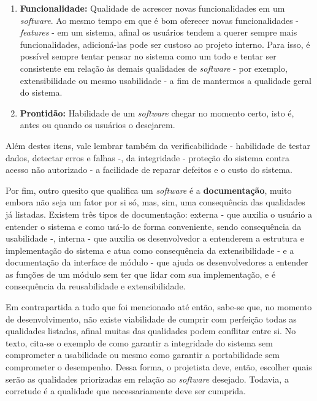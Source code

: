 \documentclass[12pt, a4paper]{article}
\begin{document}
\begin{enumerate}
            \item \textbf{Funcionalidade:} Qualidade de acrescer novas funcionalidades em um \textit{software}. Ao mesmo tempo em que é bom oferecer novas funcionalidades - \textit{features} - em um sistema, afinal os usuários tendem a querer sempre mais funcionalidades, adicioná-las pode ser custoso ao projeto interno. Para isso, é possível sempre tentar pensar no sistema como um todo e tentar ser consistente em relação às demais qualidades de \textit{software} - por exemplo, extensibilidade ou mesmo usabilidade - a fim de mantermos a qualidade geral do sistema.
            
            \item \textbf{Prontidão:} Habilidade de um \textit{software} chegar no momento certo, isto é, antes ou quando os usuários o desejarem.
        \end{enumerate}
        
    Além destes itens, vale lembrar também da verificabilidade - habilidade de testar dados, detectar erros e falhas -, da integridade - proteção do sistema contra acesso não autorizado - a facilidade de reparar defeitos e o custo do sistema. 
        
    Por fim, outro quesito que qualifica um \textit{software} é a \textbf{documentação}, muito embora não seja um fator por si só, mas, sim, uma consequência das qualidades já listadas. Existem três tipos de documentação: externa - que auxilia o usuário a entender o sistema e como usá-lo de forma conveniente, sendo consequência da usabilidade -, interna - que auxilia os desenvolvedor a entenderem a estrutura e implementação do sistema e atua como consequência da extensibilidade - e a documentação da interface de módulo - que ajuda os desenvolvedores a entender as funções de um módulo sem ter que lidar com sua implementação, e é consequência da reusabilidade e extensibilidade. 
        
    Em contrapartida a tudo que foi mencionado até então, sabe-se que, no momento de desenvolvimento, não existe viabilidade de cumprir com perfeição todas as qualidades listadas, afinal muitas das qualidades podem conflitar entre si. No texto, cita-se o exemplo de como garantir a integridade do sistema sem comprometer a usabilidade ou mesmo como garantir a portabilidade sem comprometer o desempenho. Dessa forma, o projetista deve, então, escolher quais serão as qualidades priorizadas em relação ao \textit{software} desejado. Todavia, a corretude é a qualidade que necessariamente deve ser cumprida.
    
\end{document}
